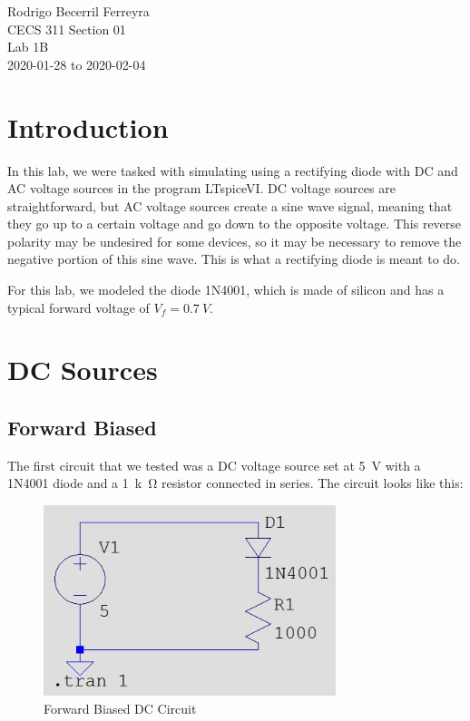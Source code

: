 \documentclass{article}
\begin{document}
\begin{flushright}
    \noindent
    Rodrigo Becerril Ferreyra\\
    CECS 311 Section 01\\
    Lab 1B\\
    2020-01-28 to 2020-02-04
\end{flushright}

\section{Introduction} In this lab, we were tasked with simulating
using a rectifying diode with DC and AC voltage sources in
the program LTspiceVI. DC voltage sources are straightforward,
but AC voltage
sources create a sine wave signal, meaning that they
go up to a certain voltage and go down to the opposite voltage.
This reverse polarity may be undesired for some devices, so
it may be necessary to remove the negative portion of this
sine wave. This is what a rectifying diode is meant to do.

For this lab, we modeled the diode 1N4001, which is made of
silicon and has a typical forward voltage of \(V_f = \SI{0.7}{V}\).

\section{DC Sources} \subsection{Forward Biased}
The first circuit
that we tested was a DC voltage source set at \SI{5}{V}
with a 1N4001 diode and a \SI{1}{k\ohm} resistor connected
in series. The circuit looks like this:

\begin{figure}[h]
    \centering
    \includegraphics[height=15em]{Images/Circuit1.jpg}
    \caption{Forward Biased DC Circuit}
\end{figure}
\end{document}
